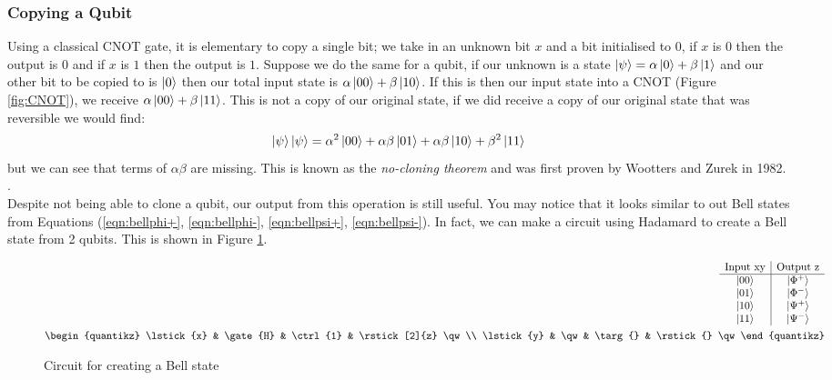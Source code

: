\documentclass[reqno]{amsart}
\numberwithin{equation}{section}
\numberwithin{figure}{section}
\begin{document}
\subsubsection{Copying a Qubit}
\begin{justify}
    Using a classical CNOT gate, it is elementary to copy a single bit; we take in an unknown bit $x$ and a bit initialised to $0$, if $x$ is $0$ then the output is $0$ and if $x$ is $1$ then the output is $1$. Suppose we do the same for a qubit, if our unknown is a state $\ket{\psi} = \alpha\ket{0} + \beta\ket{1}$ and our other bit to be copied to is $\ket{0}$ then our total input state is $\alpha\ket{00} + \beta\ket{10}$. If this is then our input state into a CNOT (Figure \ref{fig:CNOT}), we receive $\alpha\ket{00} + \beta\ket{11}$. This is not a copy of our original state, if we did receive a copy of our original state that was reversible we would find:
    \begin{equation}
        \ket{\psi}\ket{\psi} = \alpha^{2}\ket{00} + \alpha\beta\ket{01} + \alpha\beta\ket{10} + \beta^{2}\ket{11}
    \end{equation}
but we can see that terms of $\alpha\beta$ are missing. This is known as the \textit{no-cloning theorem} and was first proven by Wootters and Zurek in 1982. \cite{WoottersZurek1982}. \\

Despite not being able to clone a qubit, our output from this operation is still useful. You may notice that it looks similar to out Bell states from Equations (\ref{eqn:bellphi+}, \ref{eqn:bellphi-}, \ref{eqn:bellpsi+}, \ref{eqn:bellpsi-}). In fact, we can make a circuit using Hadamard to create a Bell state from 2 qubits. This is shown in Figure \ref{fig:BellState}.
    \begin{figure}[h]
        \begin{eqnarray*}
            \begin{array}{c|c}
                \text{Input xy} & \text{Output z} \\ 
                \hline
                \ket{00} & \ket{\Phi^{+}} \\
                \ket{01} & \ket{\Phi^{-}} \\
                \ket{10} & \ket{\Psi^{+}} \\
                \ket{11} & \ket{\Psi^{-}}
            \end{array} \\
            \begin{quantikz}
                \lstick{x} & \gate{H} & \ctrl{1} & \rstick[2]{z} \qw \\
                \lstick{y} & \qw & \targ{} & \rstick{} \qw
            \end{quantikz}
        \end{eqnarray*}
        \caption{Circuit for creating a Bell state}
        \label{fig:BellState}
    \end{figure}
\end{justify}
\end{document}
